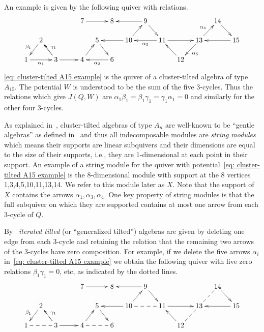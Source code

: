 \documentclass[ALCO,ThmDefs,Unicode,epreuves]{cedram}
\begin{document}
An example is given by the following quiver with relations.
\begin{equation}\label{eq: cluster-tilted A15 example}
\xymatrixrowsep{15pt}\xymatrixcolsep{10pt}
\xymatrix{%
  & & &   & 7\ar[rr]  &  &8 & &9\ar[dr]\ar[ll] & & &  &14\ar[dr]\\ %
&2\ar[ld]_{\beta_1} & & &&5\ar[dr] & &10\ar[ru]\ar[ll] && 
	11 \ar[ll]^{\alpha_3}\ar[rr]&
	 &13\ar[ur]^{\alpha_4} \ar[ld]^{\alpha_5}& &15\ar[ll]\\%
1\ar[rr]_{\alpha_1} &&3\ar[rr]\ar[lu] \ar[lu]_{\gamma_1}& &4\ar[ru] & &6\ar[ll]^{\alpha_2} & & & 
	 &
	12\ar[ul]%
	}%
\end{equation}
\eqref{eq: cluster-tilted A15 example} is the quiver of a cluster-tilted algebra of type $A_{15}$. The potential $W$ is understood to be the sum of the five 3-cycles. Thus the relations which give $J(Q,W)$ are $\alpha_1\beta_1=\beta_1\gamma_1=\gamma_1\alpha_1=0$ and similarly for the other four 3-cycles. 

As explained in~\cite[Sec~2.5]{Asse2}, cluster-tilted algebras of type $A_n$ are well-known to be ``gentle algebras'' as defined in~\cite{BR} and thus all indecomposable modules are \emph{string modules} which means their supports are linear subquivers and their dimensions are equal to the size of their supports, i.e., they are 1-dimensional at each point in their support. An example of a string module for the quiver with potential~\eqref{eq: cluster-tilted A15 example} is the 8-dimensional module with support at the 8 vertices 1,3,4,5,10,11,13,14. We refer to this module later as $X$. Note that the support of $X$ contains the arrows $\alpha_1,\alpha_3,\alpha_4$. One key property of string modules is that the full subquiver on which they are supported contains at most one arrow from each 3-cycle of $Q$.

By~\cite{AH} \emph{iterated tilted} (or ``generalized tilted'') algebras are given by deleting one edge from each 3-cycle and retaining the relation that the remaining two arrows of the 3-cycles have zero composition. For example, if we delete the five arrows $\alpha_i$ in~\eqref{eq: cluster-tilted A15 example} we obtain the following quiver with five zero relations $\beta_1\gamma_1=0$, etc, as indicated by the dotted lines.
%
\begin{equation}\label{eq: tilted A15 example}
\xymatrixrowsep{15pt}\xymatrixcolsep{10pt}
\xymatrix{%
  & & &   & 7\ar[rr]  &  &8 & &9\ar[dr]\ar[ll] & & &  &14\ar[dr]\\ %
&2\ar[ld]_{\beta_1} & & &&5\ar[dr] & &10\ar[ru]\ar[ll] && 
	11 \ar@{--}[ll]\ar[rr]&
	 &13\ar@{--}[ur] \ar@{--}[ld]& &15\ar[ll]\\%
1\ar@{--}[rr] &&3\ar[rr]\ar[lu]_{\gamma_1} \ar@{--}[lu]& &4\ar[ru] & &6\ar@{--}[ll] & & & 
	 &
	12\ar[ul]%
	}%
\end{equation}
\end{document}
